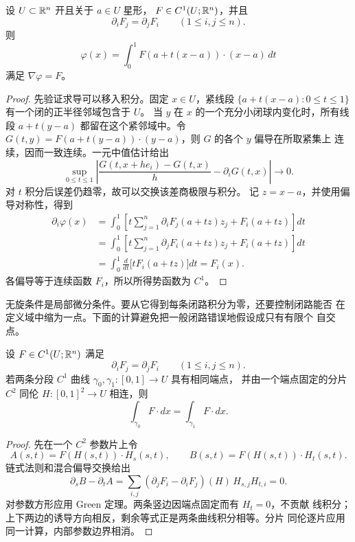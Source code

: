 \begin{proposition}[星形域上的势函数]
\label{prop:star-shaped-potential}
设 \(U\subset\mathbb{R}^n\) 开且关于 \(a\in U\) 星形，
\(F\in C^1(U;\mathbb{R}^n)\)，并且
\[
 \partial_iF_j=\partial_jF_i\qquad(1\le i,j\le n).
\]
则
\[
 \varphi(x)=\int_0^1F(a+t(x-a))\cdot(x-a)\,dt
\]
满足 \(\nabla\varphi=F\)。
\end{proposition}

\begin{proof}
先验证求导可以移入积分。固定 $x\in U$，紧线段
$\{a+t(x-a):0\le t\le1\}$ 有一个闭的正半径邻域包含于 $U$。
当 $y$ 在 $x$ 的一个充分小闭球内变化时，所有线段
$a+t(y-a)$ 都留在这个紧邻域中。令
$G(t,y)=F(a+t(y-a))\cdot(y-a)$，则 $G$ 的各个 $y$ 偏导在所取紧集上
连续，因而一致连续。一元中值估计给出
\[
 \sup_{0\le t\le1}
 \left|\frac{G(t,x+he_i)-G(t,x)}h-\partial_iG(t,x)\right|
 \longrightarrow0.
\]
对 $t$ 积分后误差仍趋零，故可以交换该差商极限与积分。
记 \(z=x-a\)，并使用偏导对称性，得到
\begin{align*}
 \partial_i\varphi(x)
 &=\int_0^1\left[
 t\sum_{j=1}^n\partial_iF_j(a+tz)z_j+F_i(a+tz)\right]dt\\
 &=\int_0^1\left[
 t\sum_{j=1}^n\partial_jF_i(a+tz)z_j+F_i(a+tz)\right]dt\\
 &=\int_0^1\frac{d}{dt}\bigl[tF_i(a+tz)\bigr]dt
 =F_i(x).
\end{align*}
各偏导等于连续函数 $F_i$，所以所得势函数为 $C^1$。
\end{proof}

无旋条件是局部微分条件。要从它得到每条闭路积分为零，还要控制闭路能否
在定义域中缩为一点。下面的计算避免把一般闭路错误地假设成只有有限个
自交点。

\begin{lemma}[闭一形式的同伦不变性]
\label{lem:closed-field-homotopy-invariance}
设 \(F\in C^1(U;\mathbb{R}^n)\) 满足
\[
 \partial_iF_j=\partial_jF_i
 \qquad(1\le i,j\le n).
\]
若两条分段 \(C^1\) 曲线 \(\gamma_0,\gamma_1:[0,1]\to U\) 具有相同端点，
并由一个端点固定的分片 \(C^2\) 同伦
\(H:[0,1]^2\to U\) 相连，则
\[
 \int_{\gamma_0}F\cdot dx=\int_{\gamma_1}F\cdot dx.
\]
\end{lemma}

\begin{proof}
先在一个 \(C^2\) 参数片上令
\[
 A(s,t)=F(H(s,t))\cdot H_s(s,t),\qquad
 B(s,t)=F(H(s,t))\cdot H_t(s,t).
\]
链式法则和混合偏导交换给出
\[
 \partial_sB-\partial_tA
 =\sum_{i,j}
  (\partial_jF_i-\partial_iF_j)(H)\,
  H_{s,j}H_{t,i}=0.
\]
对参数方形应用 Green 定理。两条竖边因端点固定而有 \(H_t=0\)，不贡献
线积分；上下两边的诱导方向相反，剩余等式正是两条曲线积分相等。分片
同伦逐片应用同一计算，内部参数边界相消。
\end{proof}

